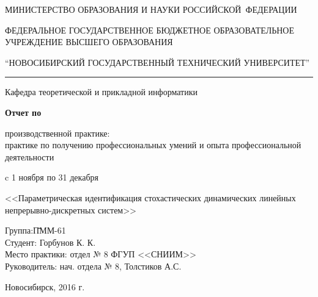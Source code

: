 \documentclass[a4paper,14pt]{extarticle}
\begin{document}
\begin{titlepage}

	\begin{center}
		\MakeTextUppercase{Министерство образования и науки Российской~Федерации}

		\bigbreak

		ФЕДЕРАЛЬНОЕ ГОСУДАРСТВЕННОЕ БЮДЖЕТНОЕ ОБРАЗОВАТЕЛЬНОЕ УЧРЕЖДЕНИЕ
			ВЫСШЕГО ОБРАЗОВАНИЯ

		\bigbreak

		\MakeTextUppercase{\enquote{Новосибирский государственный технический
			университет}}
		\vspace{5pt}
		\hrule

		\bigbreak

		Кафедра теоретической и прикладной информатики

		\vspace{50pt}

		\textbf{\LARGE{Отчет по}\\}

		\bigbreak

		производственной практике: \\
			практике по получению профессиональных умений и опыта профессиональной
			деятельности

		\bigbreak

		c 1 ноября по 31 декабря

		\bigbreak

		<<Параметрическая идентификация стохастических динамических линейных
		непрерывно-дискретных систем>>

		\vspace{50pt}

	\end{center}

	\begin{flushleft}
		\begin{tabbing}
			Группа:\qquad\qquad\qquad \= ПММ-61\\
			Студент:                  \> Горбунов К. К.\\
			Место практики:           \> отдел № 8 ФГУП <<СНИИМ>> \\
			Руководитель:             \> нач. отдела № 8, Толстиков А.С.
		\end{tabbing}
	\end{flushleft}

	\begin{center}
		\vspace{\fill}
		Новосибирск, 2016 г.
	\end{center}

\end{titlepage}
\end{document}
